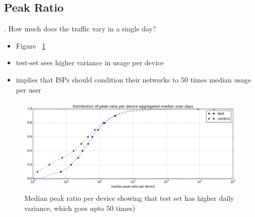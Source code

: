 

\subsection{Peak Ratio}
\label{subsec:peak-ratio}

. How much does the traffic vary in a single day?

\begin{itemize}
\itemsep0em 
\item Figure ~\ref{fig:CDF-peak-ratio-median}
\item test-set sees higher variance in usage per device
\item implies that ISPs should condition their networks to 50 times median usage per user
\end{itemize}



\begin{figure}[ht!]
\begin{minipage}{0.90\linewidth}
\centering
\includegraphics[width=1\linewidth]{figures/peakratio-CDF-devices-MEDIAN.png}
\caption{Median peak ratio per device showing that test set has higher daily variance, which goes upto 50 times)}
\label{fig:CDF-peak-ratio-median}
\end{minipage}
\end{figure}






%
%


